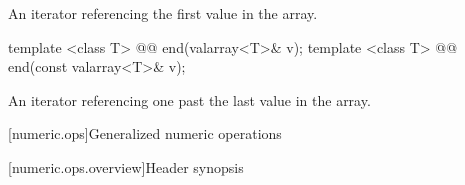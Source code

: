 \begin{itemdescr}
\pnum
\returns An iterator referencing the first value in the array.
\end{itemdescr}

%
\begin{itemdecl}
template <class T> @@ end(valarray<T>& v);
template <class T> @@ end(const valarray<T>& v);
\end{itemdecl}

\begin{itemdescr}
\pnum
\returns An iterator referencing one past the last value in the array.
\end{itemdescr}


[numeric.ops]{Generalized numeric operations}

[numeric.ops.overview]{Header  synopsis}

